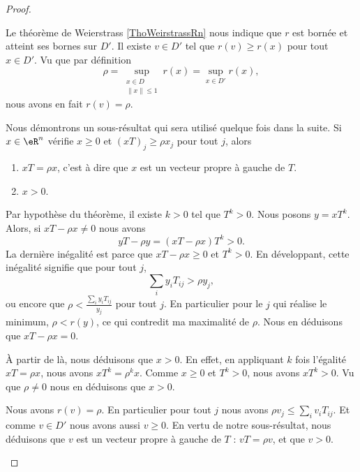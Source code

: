 \begin{proof}
\begin{subproof}
        \spitem[\( v\) et \( \rho\)]
            Le théorème de Weierstrass \ref{ThoWeirstrassRn} nous indique que \( r\) est bornée et atteint ses bornes sur \( D'\). Il existe \( v\in D'\) tel que \( r(v)\geq r(x)\) pour tout \( x\in D'\). Vu que par définition
            \begin{equation}
                \rho=\sup_{\substack{x\in D\\\| x \|\leq 1}}r(x)=\sup_{x\in D'}r(x),
            \end{equation}
            nous avons en fait \( r(v)=\rho\).

        Nous démontrons un sous-résultat qui sera utilisé quelque fois dans la suite. Si \( x\in \eR^n\) vérifie \( x\geq 0\) et \( (xT)_j\geq \rho x_j\) pour tout \( j\), alors
        \begin{enumerate}
            \item
                \( xT=\rho x\), c'est à dire que \( x\) est un vecteur propre à gauche de \( T\).
            \item
                \( x>0\).
        \end{enumerate}
        Par hypothèse du théorème, il existe \( k>0\) tel que \( T^k>0\). Nous posons \( y=xT^k\). Alors, si \( xT-\rho x\neq 0\) nous avons
        \begin{equation}
            yT-\rho y=(xT-\rho x)T^k>0.
        \end{equation}
        La dernière inégalité est parce que  \( xT-\rho x\geq 0\) et \( T^k>0\). En développant, cette inégalité signifie que pour tout \( j\),
        \begin{equation}
            \sum_iy_iT_{ij}>\rho y_j,
        \end{equation}
        ou encore que $\rho<\frac{ \sum_iy_iT_{ij} }{ y_j }$ pour tout \( j\). En particulier pour le \( j\) qui réalise le minimum, \( \rho<r(y)\), ce qui contredit ma maximalité de \( \rho\). Nous en déduisons que \( xT-\rho x=0\).
        
        À partir de là, nous déduisons que \( x>0\). En effet, en appliquant \( k\) fois l'égalité \( xT=\rho x\), nous avons \( xT^k=\rho^k x\). Comme \( x\geq 0\) et \( T^k>0\), nous avons \( xT^k>0\). Vu que \( \rho\neq 0\) nous en déduisons que \( x>0\).

        Nous avons \( r(v)=\rho\). En particulier pour tout \( j\) nous avons \( \rho v_j \leq \sum_iv_iT_{ij}\). Et comme \( v\in D'\) nous avons aussi \( v\geq 0\). En vertu de notre sous-résultat, nous déduisons que \( v\) est un vecteur propre à gauche de \( T\) : \( vT=\rho v\), et que \( v>0\).

    \end{subproof}
\end{proof}


